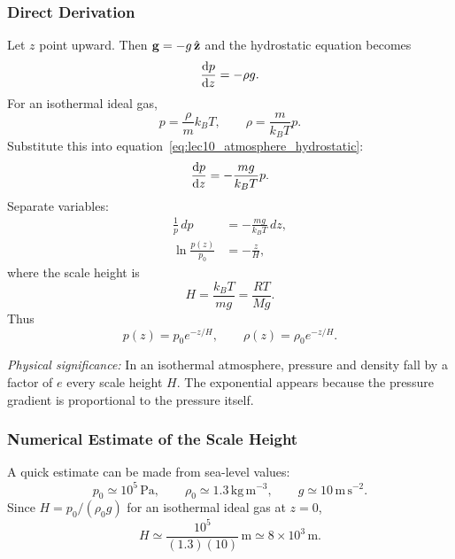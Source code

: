 \documentclass[../main.tex]{subfiles}
\begin{document}
\subsubsection*{Direct Derivation}
Let $z$ point upward. Then $\mathbf{g}=-g\,\hat{\mathbf{z}}$ and the hydrostatic equation becomes
\begin{equation}
  \dv{p}{z}=-\rho g.
  \label{eq:lec10_atmosphere_hydrostatic}
\end{equation}
For an isothermal ideal gas,
\begin{equation}
  p=\frac{\rho}{m}k_BT,
  \qquad
  \rho=\frac{m}{k_BT}p.
  \label{eq:lec10_atmosphere_rho_p}
\end{equation}
Substitute this into equation~\eqref{eq:lec10_atmosphere_hydrostatic}:
\begin{equation}
  \dv{p}{z}
  =
  -\frac{mg}{k_BT}p.
  \label{eq:lec10_atmosphere_ode}
\end{equation}
Separate variables:
\begin{align}
  \frac{1}{p}\,dp
  &=
  -\frac{mg}{k_BT}\,dz,
  \label{eq:lec10_atmosphere_separation}\\
  \ln\frac{p(z)}{p_0}
  &=
  -\frac{z}{H},
  \label{eq:lec10_atmosphere_log_solution}
\end{align}
where the scale height is
\begin{equation}
  \boxed{H=\frac{k_BT}{mg}=\frac{RT}{Mg}.}
  \label{eq:lec10_scale_height}
\end{equation}
Thus
\begin{equation}
  \boxed{p(z)=p_0 e^{-z/H},\qquad \rho(z)=\rho_0 e^{-z/H}.}
  \label{eq:lec10_exponential_atmosphere}
\end{equation}

\textit{Physical significance:} In an isothermal atmosphere, pressure and density fall by a factor of $e$ every scale height $H$. The exponential appears because the pressure gradient is proportional to the pressure itself.

\subsubsection*{Numerical Estimate of the Scale Height}
A quick estimate can be made from sea-level values:
\begin{equation}
  p_0\simeq 10^5\,\mathrm{Pa},
  \qquad
  \rho_0\simeq 1.3\,\mathrm{kg\,m^{-3}},
  \qquad
  g\simeq 10\,\mathrm{m\,s^{-2}}.
  \label{eq:lec10_air_numbers}
\end{equation}
Since $H=p_0/(\rho_0 g)$ for an isothermal ideal gas at $z=0$,
\begin{equation}
  \boxed{
  H
  \simeq
  \frac{10^5}{(1.3)(10)}\,\mathrm{m}
  \simeq
  8\times 10^3\,\mathrm{m}.}
  \label{eq:lec10_atmosphere_height_estimate}
\end{equation}
\end{document}
